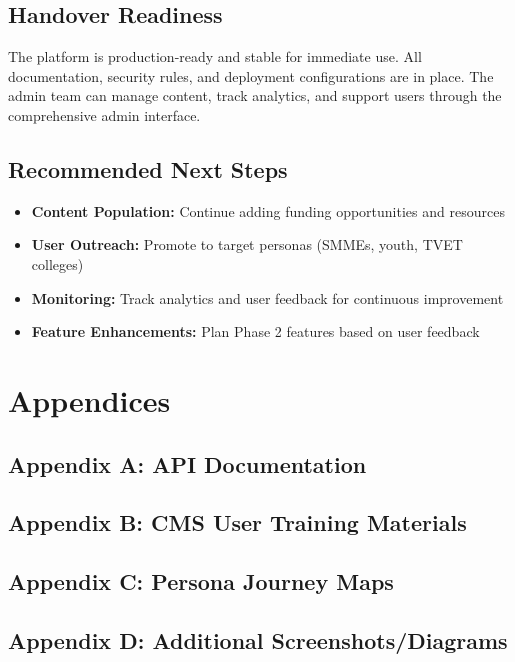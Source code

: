 \documentclass[a4paper,12pt]{article}
\begin{document}
\subsection{Handover Readiness}
The platform is production-ready and stable for immediate use. All documentation, security rules, and deployment configurations are in place. The admin team can manage content, track analytics, and support users through the comprehensive admin interface.

\subsection{Recommended Next Steps}
\begin{itemize}
    \item \textbf{Content Population:} Continue adding funding opportunities and resources
    \item \textbf{User Outreach:} Promote to target personas (SMMEs, youth, TVET colleges)
    \item \textbf{Monitoring:} Track analytics and user feedback for continuous improvement
    \item \textbf{Feature Enhancements:} Plan Phase 2 features based on user feedback
\end{itemize}

\section{Appendices}
\subsection{Appendix A: API Documentation}
\subsection{Appendix B: CMS User Training Materials}
\subsection{Appendix C: Persona Journey Maps}
\subsection{Appendix D: Additional Screenshots/Diagrams}
\end{document}
